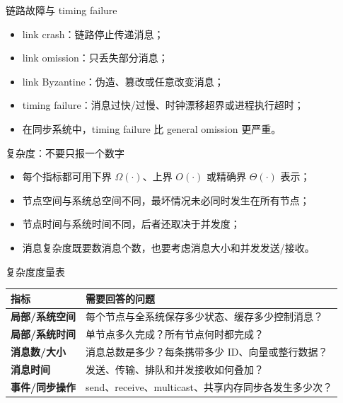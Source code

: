 \documentclass[UTF8,fontset=none,aspectratio=169,10pt]{beamer}
\begin{document}
\begin{frame}{链路故障与 timing failure}
\begin{itemize}
  \item link crash：链路停止传递消息；
  \item link omission：只丢失部分消息；
  \item link Byzantine：伪造、篡改或任意改变消息；
  \item timing failure：消息过快/过慢、时钟漂移超界或进程执行超时；
  \item 在同步系统中，timing failure 比 general omission 更严重。
\end{itemize}
\vfill
\begin{center}
\end{center}
\end{frame}

\begin{frame}{复杂度：不要只报一个数字}
\begin{itemize}
  \item 每个指标都可用下界 $\Omega(\cdot)$、上界 $O(\cdot)$ 或精确界 $\Theta(\cdot)$ 表示；
  \item 节点空间与系统总空间不同，最坏情况未必同时发生在所有节点；
  \item 节点时间与系统时间不同，后者还取决于并发度；
  \item 消息复杂度既要数消息个数，也要考虑消息大小和并发发送/接收。
\end{itemize}
\end{frame}

\begin{frame}{复杂度度量表}
\begin{tabularx}{\linewidth}{>{\bfseries}p{3.1cm}X}
\toprule
指标 & 需要回答的问题 \\
\midrule
局部/系统空间 & 每个节点与全系统保存多少状态、缓存多少控制消息？ \\
局部/系统时间 & 单节点多久完成？所有节点何时都完成？ \\
消息数/大小 & 消息总数是多少？每条携带多少 ID、向量或整行数据？ \\
消息时间 & 发送、传输、排队和并发接收如何叠加？ \\
事件/同步操作 & send、receive、multicast、共享内存同步各发生多少次？ \\
\bottomrule
\end{tabularx}
\end{frame}
\end{document}
